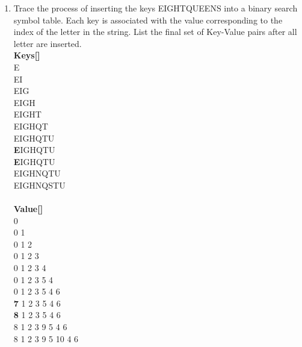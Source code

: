 \documentclass{article}
\begin{document}
\begin{enumerate}
\item Trace the process of inserting the keys EIGHTQUEENS into a binary search symbol table. Each key is associated with the value corresponding to the index of the letter in the string. List the final set of Key-Value pairs after all letter are inserted.
\\
\textbf{Keys[]} \\
E\\
EI\\
EIG\\
EIGH\\
EIGHT\\
EIGHQT\\
EIGHQTU\\
\textbf{E}IGHQTU\\
\textbf{E}IGHQTU\\
EIGHNQTU\\
EIGHNQSTU\\
\\
\textbf{Value[]}\\
0\\
0 1\\
0 1 2\\
0 1 2 3\\
0 1 2 3 4\\
0 1 2 3 5 4\\
0 1 2 3 5 4 6\\
\textbf{7} 1 2 3 5 4 6 \\
\textbf{8} 1 2 3 5 4 6 \\
8 1 2 3 9 5 4 6 \\
8 1 2 3 9 5 10 4 6 \\


\end{enumerate}
\end{document}
